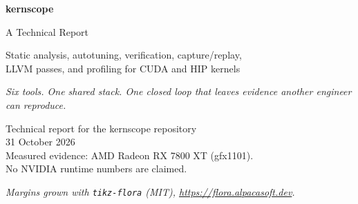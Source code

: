 \documentclass[11pt,twoside,a4paper]{article}
\begin{document}
\begin{titlepage}
\floraon
\thispagestyle{empty}
\begin{floratitle}
\centering
{\Huge\sffamily\bfseries kernscope\par}
\vspace{0.45em}
{\LARGE A Technical Report\par}
\vspace{0.65em}
{\large Static analysis, autotuning, verification, capture/replay,\\
LLVM passes, and profiling for CUDA and HIP kernels\par}
\end{floratitle}

\vspace{2.4cm}
\begin{center}
\begin{minipage}{0.72\textwidth}
\centering\small\itshape
Six tools. One shared stack. One closed loop that leaves evidence another
engineer can reproduce.
\end{minipage}
\end{center}

\vfill
\begin{center}
\small
Technical report for the kernscope repository\\
31 October 2026\\[0.8em]
{\footnotesize Measured evidence: AMD Radeon RX 7800 XT (gfx1101).\\
No NVIDIA runtime numbers are claimed.}
\end{center}
\vspace{0.7cm}
\begin{center}
{\footnotesize\itshape Margins grown with \texttt{tikz-flora} (MIT),
\url{https://flora.alpacasoft.dev}.\par}
\end{center}
\end{titlepage}
\floraoff
\restoregeometry

\setcounter{page}{2}
\end{document}
